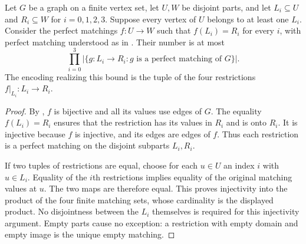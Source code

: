 \begin{lemma}
Let $G$ be a graph on a finite vertex set, let $U,W$ be disjoint parts,
and let $L_i\subseteq U$ and $R_i\subseteq W$ for $i=0,1,2,3$.
Suppose every vertex of $U$ belongs to at least one $L_i$.
Consider the perfect matchings $f:U\to W$ such that
$f(L_i)=R_i$ for every $i$, with perfect matching understood as in
. Their number is at most
\[
 \prod_{i=0}^3
 \bigl|\{g:L_i\to R_i:g\text{ is a perfect matching of }G\}\bigr|.
\]
The encoding realizing this bound is the tuple of the four restrictions
$f|_{L_i}:L_i\to R_i$.
\end{lemma}
\begin{proof}
By , $f$ is bijective and all its values use
edges of $G$. The equality $f(L_i)=R_i$ ensures that the restriction
has its values in $R_i$ and is onto $R_i$. It is injective because $f$
is injective, and its edges are edges of $f$. Thus each restriction is
a perfect matching on the disjoint subparts $L_i,R_i$.

If two tuples of restrictions are equal, choose for each $u\in U$ an
index $i$ with $u\in L_i$. Equality of the $i$th restrictions implies
equality of the original matching values at $u$. The two maps are
therefore equal. This proves injectivity into the product of the four
finite matching sets, whose cardinality is the displayed product.
No disjointness between the $L_i$ themselves is required for this
injectivity argument. Empty parts cause no exception: a restriction
with empty domain and empty image is the unique empty matching.
\end{proof}
